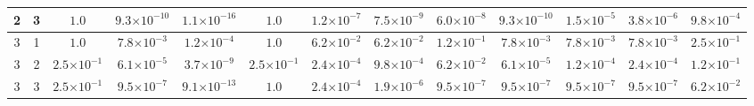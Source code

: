 \begin{landscape}
\begin{table}[H]
{\begin{tabular}{ccccccccccccc}
\hline
2 & 3 & $1.0$ & $9.3{\scriptstyle\times 10^{-10}}$ & \textbf{$1.1{\scriptstyle\times 10^{-16}}$} & $1.0$ & $1.2{\scriptstyle\times 10^{-7}}$ & $7.5{\scriptstyle\times 10^{-9}}$ & $6.0{\scriptstyle\times 10^{-8}}$ & $9.3{\scriptstyle\times 10^{-10}}$ & $1.5{\scriptstyle\times 10^{-5}}$ & $3.8{\scriptstyle\times 10^{-6}}$ & $9.8{\scriptstyle\times 10^{-4}}$ \\
\hline
3 & 1 & $1.0$ & $7.8{\scriptstyle\times 10^{-3}}$ & \textbf{$1.2{\scriptstyle\times 10^{-4}}$} & $1.0$ & $6.2{\scriptstyle\times 10^{-2}}$ & $6.2{\scriptstyle\times 10^{-2}}$ & $1.2{\scriptstyle\times 10^{-1}}$ & $7.8{\scriptstyle\times 10^{-3}}$ & $7.8{\scriptstyle\times 10^{-3}}$ & $7.8{\scriptstyle\times 10^{-3}}$ & $2.5{\scriptstyle\times 10^{-1}}$ \\
\hline
3 & 2 & $2.5{\scriptstyle\times 10^{-1}}$ & $6.1{\scriptstyle\times 10^{-5}}$ & \textbf{$3.7{\scriptstyle\times 10^{-9}}$} & $2.5{\scriptstyle\times 10^{-1}}$ & $2.4{\scriptstyle\times 10^{-4}}$ & $9.8{\scriptstyle\times 10^{-4}}$ & $6.2{\scriptstyle\times 10^{-2}}$ & $6.1{\scriptstyle\times 10^{-5}}$ & $1.2{\scriptstyle\times 10^{-4}}$ & $2.4{\scriptstyle\times 10^{-4}}$ & $1.2{\scriptstyle\times 10^{-1}}$ \\
\hline
3 & 3 & $2.5{\scriptstyle\times 10^{-1}}$ & $9.5{\scriptstyle\times 10^{-7}}$ & \textbf{$9.1{\scriptstyle\times 10^{-13}}$} & $1.0$ & $2.4{\scriptstyle\times 10^{-4}}$ & $1.9{\scriptstyle\times 10^{-6}}$ & $9.5{\scriptstyle\times 10^{-7}}$ & $9.5{\scriptstyle\times 10^{-7}}$ & $9.5{\scriptstyle\times 10^{-7}}$ & $9.5{\scriptstyle\times 10^{-7}}$ & $6.2{\scriptstyle\times 10^{-2}}$ \\
\bottomrule
\end{tabular}
}%
\end{table}
\end{landscape}

